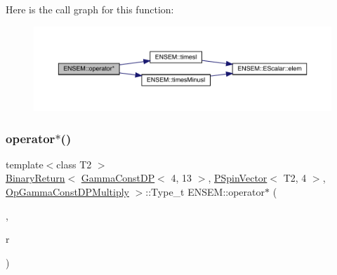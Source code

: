 Here is the call graph for this function\+:\nopagebreak
\begin{figure}[H]
\begin{center}
\leavevmode
\includegraphics[width=350pt]{dd/d6d/group__primspinvector_gab182b2b8559b1382be36d58f251cec0e_cgraph}
\end{center}
\end{figure}
\mbox{\label{group__primspinvector_gaa05448d24f9c6526e5785b8c81a604bd}} 
\subsubsection{\texorpdfstring{operator$\ast$()}{operator*()}\hspace{0.1cm}{\footnotesize\ttfamily [30/32]}}
{\footnotesize\ttfamily template$<$class T2 $>$ \\
\mbox{\hyperlink{structENSEM_1_1BinaryReturn}{Binary\+Return}}$<$ \mbox{\hyperlink{classENSEM_1_1GammaConstDP}{Gamma\+Const\+DP}}$<$ 4, 13 $>$, \mbox{\hyperlink{classENSEM_1_1PSpinVector}{P\+Spin\+Vector}}$<$ T2, 4 $>$, \mbox{\hyperlink{structENSEM_1_1OpGammaConstDPMultiply}{Op\+Gamma\+Const\+D\+P\+Multiply}} $>$\+::Type\+\_\+t E\+N\+S\+E\+M\+::operator$\ast$ (\begin{DoxyParamCaption}\item[{const \mbox{\hyperlink{classENSEM_1_1GammaConstDP}{Gamma\+Const\+DP}}$<$ 4, 13 $>$ \&}]{,  }\item[{const \mbox{\hyperlink{classENSEM_1_1PSpinVector}{P\+Spin\+Vector}}$<$ T2, 4 $>$ \&}]{r }\end{DoxyParamCaption})\hspace{0.3cm}{\ttfamily [inline]}}

\mbox{\label{group__primspinvector_gad8abbefefdc24a79b3e5e3a161441643}} 
